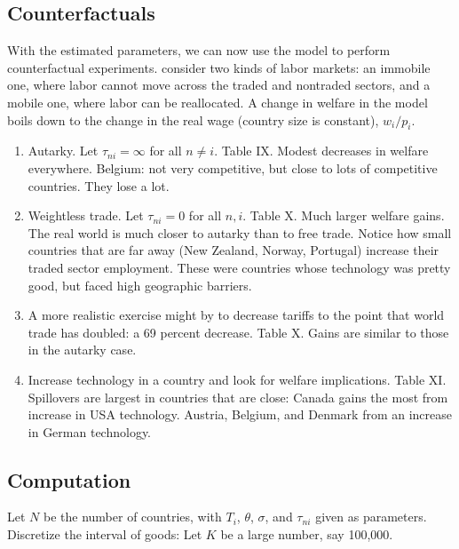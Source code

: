 \documentclass[11pt, pdftex]{article}
\begin{document}
\subsection*{Counterfactuals}
With the estimated parameters, we can now use the model to perform counterfactual experiments.  \citet{EK02} consider two kinds of labor markets: an immobile one, where labor cannot move across the traded and nontraded sectors, and a mobile one, where labor can be reallocated. A change in welfare in the model boils down to the change in the real wage (country size is constant), $w_i/p_i$.

\begin{enumerate}
  \item Autarky.  Let $\tau_{ni}=\infty$ for all $n\neq i$. Table IX.  Modest decreases in welfare everywhere.  Belgium: not very competitive, but close to lots of competitive countries.  They lose a lot.
  \item Weightless trade.  Let $\tau_{ni}=0$ for all $n,i$. Table X.  Much larger welfare gains.  The real world is much closer to autarky than to free trade. Notice how small countries that are far away (New Zealand, Norway, Portugal) increase their traded sector employment.  These were countries whose technology was pretty good, but faced high geographic barriers.
  \item A more realistic exercise might by to decrease tariffs to the point that world trade has doubled: a 69 percent decrease. Table X. Gains are similar to those in the autarky case.
  \item Increase technology in a country and look for welfare implications. Table XI.  Spillovers are largest in countries that are close: Canada gains the most from increase in USA technology.  Austria, Belgium, and Denmark from an increase in German technology.
\end{enumerate}

\subsection*{Computation}
Let $N$ be the number of countries, with $T_i$, $\theta$, $\sigma$, and $\tau_{ni}$ given as parameters.  Discretize the interval of goods: Let $K$ be a large number, say 100,000.
\end{document}
